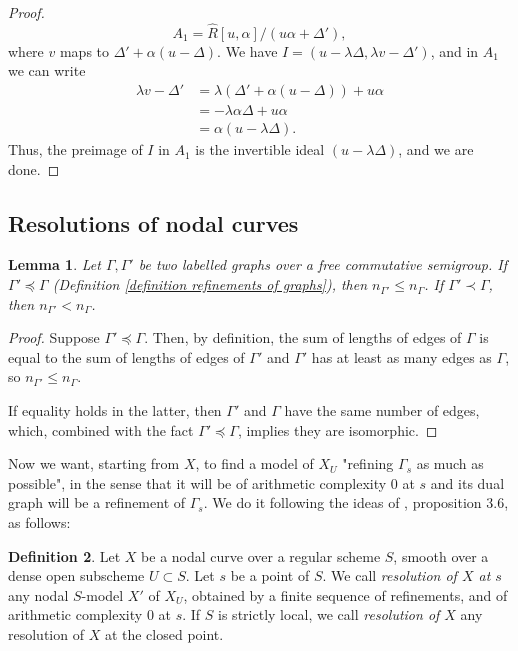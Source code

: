\documentclass[a4paper,12pt]{amsart} %
\numberwithin{equation}{subsection}
\theoremstyle{definition}
\newtheorem{definition}{Definition}[section]
\theoremstyle{plain}%
\newtheorem{lemma}[definition]{Lemma}
\theoremstyle{remark}
\begin{document}
\begin{proof}
\[
A_1=\widehat{R}[u,\alpha]/(u\alpha+\Delta'),
\]
where $v$ maps to $\Delta'+\alpha(u-\Delta)$. We have $I=(u-\lambda\Delta,\lambda v-\Delta')$, and in $A_1$ we can write
\begin{align*}
\lambda v -\Delta' & = \lambda (\Delta'+\alpha(u-\Delta)) +u\alpha \\
& = -\lambda\alpha\Delta+u\alpha \\
& = \alpha(u-\lambda\Delta).
\end{align*}
Thus, the preimage of $I$ in $A_1$ is the invertible ideal $(u-\lambda\Delta)$, and we are done.
\end{proof}


\subsection{Resolutions of nodal curves}

\begin{lemma}\label{lemme les raffinements font baisser la complexite}
Let $\Gamma,\Gamma'$ be two labelled graphs over a free commutative semigroup. If $\Gamma'\preceq\Gamma$ (Definition \ref{definition refinements of graphs}), then $n_{\Gamma'}\leq n_\Gamma$. If $\Gamma'\prec\Gamma$, then $n_{\Gamma'}< n_\Gamma$.
\end{lemma}

\begin{proof}
Suppose $\Gamma'\preceq\Gamma$. Then, by definition, the sum of lengths of edges of $\Gamma$ is equal to the sum of lengths of edges of $\Gamma'$ and $\Gamma'$ has at least as many edges as $\Gamma$, so $n_{\Gamma'}\leq n_\Gamma$.

If equality holds in the latter, then $\Gamma'$ and $\Gamma$ have the same number of edges, which, combined with the fact $\Gamma'\preceq\Gamma$, implies they are isomorphic.
\end{proof}

Now we want, starting from $X$, to find a model of $X_U$ "refining $\Gamma_s$ as much as possible", in the sense that it will be of arithmetic complexity $0$ at $s$ and its dual graph will be a refinement of $\Gamma_s$. We do it following the ideas of \cite{DeJong}, proposition 3.6, as follows:

\begin{definition}\label{definition resolutions}
	Let $X$ be a nodal curve over a regular scheme $S$, smooth over a dense open subscheme $U\subset S$. Let $s$ be a point of $S$. We call \emph{resolution of $X$ at $s$} any nodal $S$-model $X'$ of $X_U$, obtained by a finite sequence of refinements, and of arithmetic complexity $0$ at $s$. If $S$ is strictly local, we call \emph{resolution of $X$} any resolution of $X$ at the closed point.
\end{definition}
\end{document}
